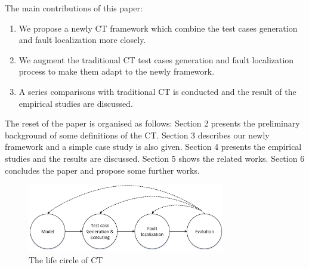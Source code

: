 \documentclass{sig-alternate}
\begin{document}
The main contributions of this paper:

 \begin{enumerate}
 \item  We propose a newly CT framework which combine the test cases generation and fault localization more closely.
 \item  We augment the traditional CT test cases generation and fault localization process to make them adapt to the newly framework.
 \item  A series comparisons with traditional CT is conducted and the result of the empirical studies are discussed.
\end{enumerate}


The reset of the paper is organised as follows: Section 2 presents the preliminary background of some definitions of the CT.  Section 3 describes our newly framework and a simple case study is also given. Section 4 presents the empirical studies and the results are discussed. Section 5 shows the related works. Section 6 concludes the paper and propose some further works.


%
%
%


\begin{figure}
 \includegraphics[width=3.4in]{CT_lifecircle.eps}
\caption{The life circle of CT}
\label{ct-life}
\end{figure}
\end{document}

